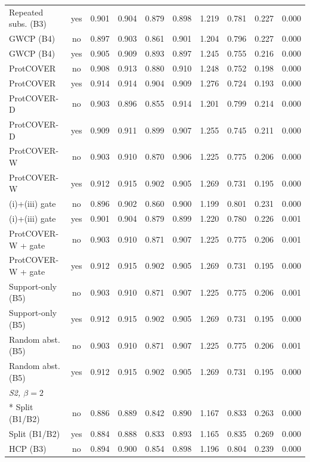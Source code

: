 \begin{longtable}{lccccccccc}
Repeated subs. (B3) & yes & 0.901 & 0.904 & 0.879 & 0.898 & 1.219 & 0.781 & 0.227 & 0.000 \\
GWCP (B4) & no & 0.897 & 0.903 & 0.861 & 0.901 & 1.204 & 0.796 & 0.227 & 0.000 \\
GWCP (B4) & yes & 0.905 & 0.909 & 0.893 & 0.897 & 1.245 & 0.755 & 0.216 & 0.000 \\
ProtCOVER & no & 0.908 & 0.913 & 0.880 & 0.910 & 1.248 & 0.752 & 0.198 & 0.000 \\
ProtCOVER & yes & 0.914 & 0.914 & 0.904 & 0.909 & 1.276 & 0.724 & 0.193 & 0.000 \\
ProtCOVER-D & no & 0.903 & 0.896 & 0.855 & 0.914 & 1.201 & 0.799 & 0.214 & 0.000 \\
ProtCOVER-D & yes & 0.909 & 0.911 & 0.899 & 0.907 & 1.255 & 0.745 & 0.211 & 0.000 \\
ProtCOVER-W & no & 0.903 & 0.910 & 0.870 & 0.906 & 1.225 & 0.775 & 0.206 & 0.000 \\
ProtCOVER-W & yes & 0.912 & 0.915 & 0.902 & 0.905 & 1.269 & 0.731 & 0.195 & 0.000 \\
(i)+(iii) gate & no & 0.896 & 0.902 & 0.860 & 0.900 & 1.199 & 0.801 & 0.231 & 0.000 \\
(i)+(iii) gate & yes & 0.901 & 0.904 & 0.879 & 0.899 & 1.220 & 0.780 & 0.226 & 0.001 \\
ProtCOVER-W + gate & no & 0.903 & 0.910 & 0.871 & 0.907 & 1.225 & 0.775 & 0.206 & 0.001 \\
ProtCOVER-W + gate & yes & 0.912 & 0.915 & 0.902 & 0.905 & 1.269 & 0.731 & 0.195 & 0.000 \\
Support-only (B5) & no & 0.903 & 0.910 & 0.871 & 0.907 & 1.225 & 0.775 & 0.206 & 0.001 \\
Support-only (B5) & yes & 0.912 & 0.915 & 0.902 & 0.905 & 1.269 & 0.731 & 0.195 & 0.000 \\
Random abst. (B5) & no & 0.903 & 0.910 & 0.871 & 0.907 & 1.225 & 0.775 & 0.206 & 0.001 \\
Random abst. (B5) & yes & 0.912 & 0.915 & 0.902 & 0.905 & 1.269 & 0.731 & 0.195 & 0.000 \\
\midrule
\multicolumn{10}{l}{\emph{S2, $\beta=2$}}\\*
Split (B1/B2) & no & 0.886 & 0.889 & 0.842 & 0.890 & 1.167 & 0.833 & 0.263 & 0.000 \\
Split (B1/B2) & yes & 0.884 & 0.888 & 0.833 & 0.893 & 1.165 & 0.835 & 0.269 & 0.000 \\
HCP (B3) & no & 0.894 & 0.900 & 0.854 & 0.898 & 1.196 & 0.804 & 0.239 & 0.000 \\

\end{longtable}
